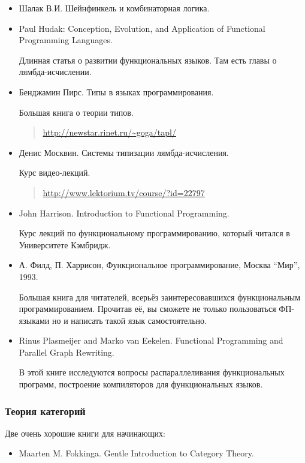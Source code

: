 \begin{itemize}
\item
  Шалак В.И. Шейнфинкель и комбинаторная логика.
\item
  Paul Hudak: Conception, Evolution, and Application of Functional
  Programming Languages.

  Длинная статья о развитии функциональных языков. Там есть главы о
  лямбда-исчислении.
\item
  Бенджамин Пирс. Типы в языках программирования.

  Большая книга о теории типов.

  \begin{quote}
  \url{http://newstar.rinet.ru/~goga/tapl/}
  \end{quote}
\item
  Денис Москвин. Системы типизации лямбда-исчисления.

  Курс видео-лекций.

  \begin{quote}
  \url{http://www.lektorium.tv/course/?id=22797}
  \end{quote}
\item
  John Harrison. Introduction to Functional Programming.

  Курс лекций по функциональному программированию, который читался в
  Университете Кэмбридж.
\item
  А. Филд, П. Харрисон, Функциональное программирование, Москва ``Мир'',
  1993.

  Большая книга для читателей, всерьёз заинтересовавшихся функциональным
  программированием. Прочитав её, вы сможете не только пользоваться
  ФП-языками но и написать такой язык самостоятельно.
\item
  Rinus Plasmeijer and Marko van Eekelen. Functional Programming and
  Parallel Graph Rewriting.

  В этой книге исследуются вопросы распараллеливания функциональных
  программ, построение компиляторов для функциональных языков.
\end{itemize}

\subsubsection{Теория категорий}

Две очень хорошие книги для начинающих:

\begin{itemize}
\item
  Maarten M. Fokkinga. Gentle Introduction to Category Theory.

  \begin{quote}
  \end{quote}
\end{itemize}

